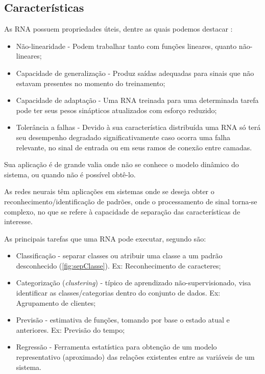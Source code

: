 \subsection{Características}

As  RNA possuem propriedades úteis, dentre as quais podemos destacar \cite{book:simonhaykin2008}:


\begin{itemize}
	\item Não-linearidade - Podem trabalhar tanto com funções lineares, quanto não-lineares;
	\item Capacidade de generalização - Produz saídas adequadas para sinais que não estavam presentes no momento do treinamento;
	\item Capacidade de adaptação - Uma RNA treinada para uma determinada tarefa pode ter seus pesos sinápticos atualizados com esforço reduzido;
	\item Tolerância a falhas - Devido à sua característica distribuída uma RNA só terá seu desempenho degradado significativamente caso ocorra uma falha relevante, no sinal de entrada ou em seus ramos de conexão entre camadas.
\end{itemize}

Sua aplicação é de grande valia onde não se conhece o modelo dinâmico do sistema, ou quando não é possível obtê-lo.

As redes neurais têm aplicações em sistemas onde se deseja obter o reconhecimento/identificação de padrões, onde o processamento de sinal torna-se complexo, no que se refere à capacidade de separação das características de interesse.

As principais tarefas que uma RNA pode executar, segundo  são:

\begin{itemize}
	\item Classificação - separar classes ou atribuir uma classe a um padrão desconhecido (\autoref{fig:sepClasse}). Ex: Reconhecimento de caracteres;
	\item Categorização (\textit{clustering}) - típico de aprendizado não-supervisionado, visa identificar as classes/categorias dentro do conjunto de dados. Ex: Agrupamento de clientes;
	\item Previsão - estimativa de funções, tomando por base o estado atual e anteriores. Ex: Previsão do tempo;
	\item Regressão - Ferramenta estatística para obtenção de um modelo representativo (aproximado) das relações existentes entre as variáveis de um sistema.
\end{itemize}



